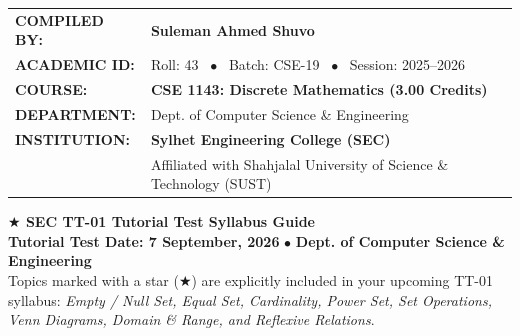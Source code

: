 \documentclass[11pt,a4paper]{article}
\begin{document}
\begin{titlepage}
\begin{flushleft}
\begin{minipage}{0.88\textwidth}
  \vspace{1.6cm}
  
  \begin{tcolorbox}[
    enhanced,
    colback=white,
    colframe=navy!30,
    boxrule=0.8pt,
    arc=4pt,
    left=16pt, right=16pt, top=14pt, bottom=14pt,
    shadow={2pt}{-2pt}{0pt}{black!10}
  ]
    \renewcommand{\arraystretch}{1.3}
    \begin{tabularx}{\linewidth}{@{}l X@{}}
      \textbf{\color{navy}\small COMPILED BY:} & {\large\bfseries\color{navy} Suleman Ahmed Shuvo} \\
      \textbf{\color{navy}\small ACADEMIC ID:} & {\small\color{darkslate} Roll: 43 \ $\bullet$ \ Batch: CSE-19 \ $\bullet$ \ Session: 2025--2026} \\
      \textbf{\color{navy}\small COURSE:} & {\small\color{teal}\bfseries CSE 1143: Discrete Mathematics (3.00 Credits)} \\
      \textbf{\color{navy}\small DEPARTMENT:} & {\small Dept. of Computer Science \& Engineering} \\
      \textbf{\color{navy}\small INSTITUTION:} & {\small\bfseries Sylhet Engineering College (SEC)} \\
      & {\footnotesize Affiliated with Shahjalal University of Science \& Technology (SUST)} \\
    \end{tabularx}
  \end{tcolorbox}
\end{minipage}
\end{flushleft}
\end{titlepage}
\newpage
\begin{tcolorbox}[
    enhanced,
    colback=lightteal,
    colframe=teal,
    boxrule=0.8pt,
    arc=3pt,
    left=10pt, right=10pt, top=7pt, bottom=7pt
]
\textbf{\color{navy}\large $\bigstar$ SEC TT-01 Tutorial Test Syllabus Guide}\\[2pt]
{\small\textbf{\color{teal}Tutorial Test Date: 7 September, 2026} $\bullet$ \textbf{Dept. of Computer Science \& Engineering}}\\[2pt]
{\small Topics marked with a star (\textbf{\color{gold!90!black}$\bigstar$}) are explicitly included in your upcoming TT-01 syllabus: \textit{Empty / Null Set, Equal Set, Cardinality, Power Set, Set Operations, Venn Diagrams, Domain \& Range, and Reflexive Relations}.}
\end{tcolorbox}
\vspace{10pt}
\end{document}
